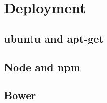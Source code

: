 \documentclass[twocolumn]{article}
\begin{document}
\section{Deployment}

\subsection{ubuntu and apt-get}

\subsection{Node and npm}

\subsection{Bower}
\end{document}
